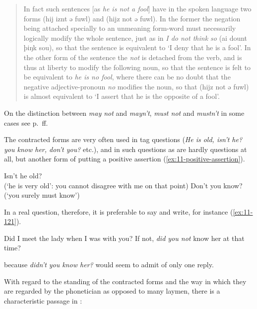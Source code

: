 \begin{quote}
In fact such sentences [as \textit{he is not a fool}] have in the spoken language two forms (hij iznt ə fuwl) and (hijz not ə fuwl). In the former the negation being attached specially to an unmeaning form-word must necessarily logically modify the whole sentence, just as in \textit{I do not think so} (ai dount þiŋk sou), so that the sentence is equivalent to `I deny that he is a fool'. In the other form of the sentence the \textit{not} is detached from the verb, and is thus at liberty to modify the following noun, so that the sentence is felt to be equivalent to \textit{he is no fool}, where there can be no doubt that the negative adjective-pronoun \textit{no} modifies the noun, so that (hijz not ə fuwl) is almost equivalent to `I assert that he is the opposite of a fool'.
\end{quote} 

On the distinction between \textit{may not} and \textit{mayn't}, \textit{must not} and \textit{mustn't} in some cases see p.~\pageref{must-and-may}ff.

The contracted forms are very often used in tag questions (\textit{He is old, isn't he? you know her, don't you?} etc.), and in such questions as are hardly questions at all, but another form of putting a positive assertion (\ref{ex:11-positive-assertion}).

\ea \label{ex:11-positive-assertion}
\ea Isn't he old? \\ (`he is very old': you cannot disagree with me on that point)
\ex Don't you know? \phantom{x} (`you surely must know') 
\z \z

\noindent In a real question, therefore, it is preferable to say and write, for instance (\ref{ex:11-121}).

\ea \label{ex:11-121}
Did I meet the lady when I was with you? If not, \emph{did you not} know her at that time?
\z

\noindent because \textit{didn't you know her?} would seem to admit of only one reply.

With regard to the standing of the contracted forms and the way in which they are regarded by the phonetician as opposed to many laymen, there is a characteristic passage in \citet[379]{wyld1906historical}:

